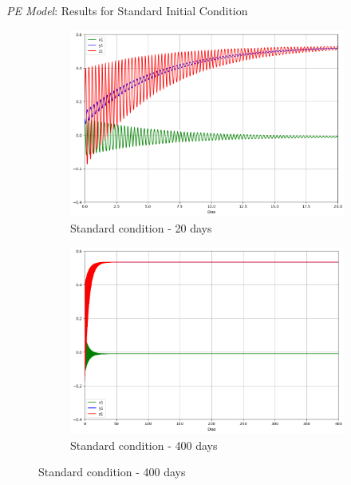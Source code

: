 
\begin{frame}{\textit{PE Model}: Results for Standard Initial Condition}
	\begin{figure}
		\centering
		\begin{subfigure}[b]{0.45\textwidth}
			\centering
			\includegraphics[width=\textwidth]{img/p01d20.png}
			\caption{Standard condition - 20 days}
			\label{fig:p01d20}
		\end{subfigure}
		\hfill
		\begin{subfigure}[b]{0.45\textwidth}
			\centering
			\includegraphics[width=\textwidth]{img/p01d400.png}
			\caption{Standard condition - 400 days}
			\label{fig:p01d400}
		\end{subfigure}
	\end{figure}
\end{frame}



